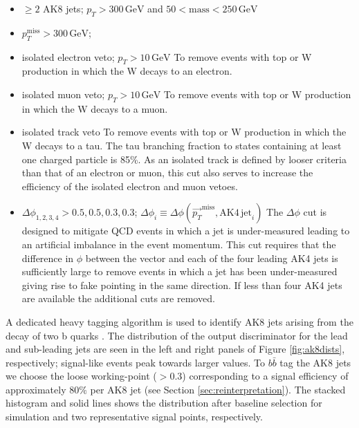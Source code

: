 \begin{itemize}
\item $\geq2$ AK8 jets; $p_{T} > 300\,\mathrm{GeV}$ and $50 < \mathrm{mass} < 250\,\mathrm{GeV}$
\item $p_{T}^{\mathrm{miss}} > 300\,\mathrm{GeV}$;
\item isolated electron veto; $p_{T}>10\,\mathrm{GeV}$\newline
To remove events with top or W production in which the W decays to an electron.
\item isolated muon veto; $p_{T}>10\,\mathrm{GeV}$\newline
To remove events with top or W production in which the W decays to a muon.
\item isolated track veto\newline
To remove events with top or W production in which the W decays to a tau. The tau branching fraction to states containing at least one charged particle is 85\%. As an isolated track is defined by looser criteria than that of an electron or muon, this cut also serves to increase the efficiency of the isolated electron and muon vetoes.

\item $\Delta\phi_{1, 2, 3, 4} > 0.5, 0.5, 0.3, 0.3$; $\Delta\phi_{i}\equiv \Delta\phi(\vec{p_{T}}^{\mathrm{miss}}, \mathrm{AK4\,jet}_{i})$\newline
The $\Delta\phi$ cut is designed to mitigate QCD events in which a jet is under-measured leading to an artificial imbalance in the event momentum. This cut requires that the difference in $\phi$ between the \ptmiss vector and each of the four leading AK4 jets is sufficiently large to remove events in which a jet has been under-measured giving rise to fake \ptmiss pointing in the same direction. If less than four AK4 jets are available the additional cuts are removed.
\end{itemize}

A dedicated heavy tagging algorithm is used to identify AK8 jets arising from the decay of two b quarks \cite{bbtagger}. The distribution of the output discriminator for the lead and sub-leading jets are seen in the left and right panels of Figure \ref{fig:ak8dists}, respectively; signal-like events peak towards larger values. To $b\bar{b}$ tag the AK8 jets we choose the loose working-point ($>$0.3) corresponding to a signal efficiency of approximately $80\%$ per AK8 jet (see Section \ref{sec:reinterpretation}). The stacked histogram and solid lines shows the distribution after baseline selection for simulation and two representative signal points, respectively.

